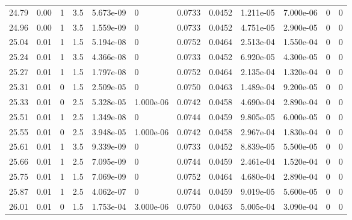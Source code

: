 \documentclass[preview]{standalone}
\begin{document}
{{{{{{{{\begin{tabular}{L{1.2cm}C{1.2cm} C{0.3cm}C{0.5cm} C{1.4cm}C{1.4cm} C{1.4cm}C{1.4cm} C{1.6cm}C{1.6cm} C{1.6cm}C{1.6cm}}
  24.79  &  0.00  & 1     & 3.5 &  5.673e-09  & 0  &  0.0733&   0.0452& 1.211e-05 & 7.000e-06   &  0 & 0  \\ 
  24.96  &  0.00  & 1     & 3.5 &  1.559e-09  & 0  &  0.0733&   0.0452& 4.751e-05 & 2.900e-05   &  0 & 0  \\ 
  25.04  &  0.01  & 1     & 1.5 &  5.194e-08  & 0  &  0.0752&   0.0464& 2.513e-04 & 1.550e-04   &  0 & 0  \\ 
  25.24  &  0.01  & 1     & 3.5 &  4.366e-08  & 0  &  0.0733&   0.0452& 6.920e-05 & 4.300e-05   &  0 & 0  \\ 
  25.27  &  0.01  & 1     & 1.5 &  1.797e-08  & 0  &  0.0752&   0.0464& 2.135e-04 & 1.320e-04   &  0 & 0  \\ 
  25.31  &  0.01  & 0     & 1.5 &  2.509e-05  & 0  &  0.0750&   0.0463& 1.489e-04 & 9.200e-05   &  0 & 0  \\ 
  25.33  &  0.01  & 0     & 2.5 &  5.328e-05  & 1.000e-06  &  0.0742&   0.0458& 4.690e-04 & 2.890e-04   &  0 & 0  \\ 
  25.51  &  0.01  & 1     & 2.5 &  1.349e-08  & 0  &  0.0744&   0.0459& 9.805e-05 & 6.000e-05   &  0 & 0  \\ 
  25.55  &  0.01  & 0     & 2.5 &  3.948e-05  & 1.000e-06  &  0.0742&   0.0458& 2.967e-04 & 1.830e-04   &  0 & 0  \\ 
  25.61  &  0.01  & 1     & 3.5 &  9.339e-09  & 0  &  0.0733&   0.0452& 8.839e-05 & 5.500e-05   &  0 & 0  \\ 
  25.66  &  0.01  & 1     & 2.5 &  7.095e-09  & 0  &  0.0744&   0.0459& 2.461e-04 & 1.520e-04   &  0 & 0  \\ 
  25.75  &  0.01  & 1     & 1.5 &  7.069e-09  & 0  &  0.0752&   0.0464& 4.680e-04 & 2.890e-04   &  0 & 0  \\ 
  25.87  &  0.01  & 1     & 2.5 &  4.062e-07  & 0  &  0.0744&   0.0459& 9.019e-05 & 5.600e-05   &  0 & 0  \\ 
  26.01  &  0.01  & 0     & 1.5 &  1.753e-04  & 3.000e-06  &  0.0750&   0.0463& 5.005e-04 & 3.090e-04   &  0 & 0  \\ 
\hline 
\end{tabular} 

}}}}}}}}
\end{document}
